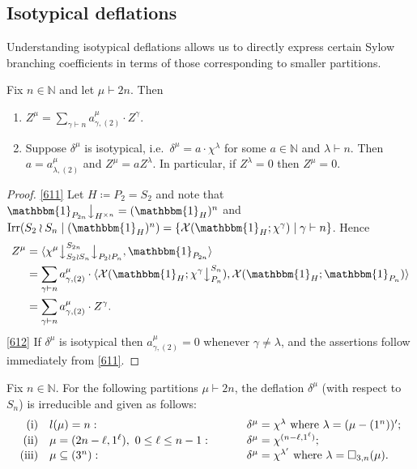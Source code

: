 \documentclass[ALCO, Unicode]{cedram}
\newcommand{\triv}{\mathbbm{1}}
\newcommand{\Irr}{\operatorname{Irr}}
\newcommand{\down}{\big\downarrow}
\newcommand{\cX}{\mathcal{X}}
\newcommand{\N}{\mathbb{N}}
\begin{document}
\subsection{Isotypical deflations}
Understanding isotypical deflations allows us to directly express certain Sylow branching coefficients in terms of those corresponding to smaller partitions.
\begin{lemma}\label{lem:isotypic}
	Fix $n\in\N$ and let $\mu\vdash 2n$. Then
	\begin{enumerate}[label=\textup{(\roman*)}]
		\item \label{611}
		$Z^\mu=\sum_{\gamma\vdash n} a^\mu_{\gamma,(2)}\cdot Z^\gamma$.
		\item \label{612} Suppose $\delta^\mu$ is isotypical, i.e.~$\delta^\mu=a\cdot\chi^\lambda$ for some $a\in\N$ and $\lambda\vdash n$. Then $a=a^\mu_{\lambda,(2)}$ and $Z^\mu=aZ^\lambda$. In particular, if $Z^\lambda=0$ then $Z^\mu=0$.
	\end{enumerate}
\end{lemma}

\begin{proof}
	\ref{611} Let $H\coloneqq P_2=S_2$ and note that $\triv_{P_{2n}}\down_{H^{\times n}} = (\triv_H)^n$ and $\Irr(S_2\wr S_n\mid (\triv_H)^n)=\{\cX(\triv_H;\chi^\gamma) \mid \gamma\vdash n \}$. Hence
	\begin{align*} Z^\mu &= \langle \chi^\mu\down^{S_{2n}}_{S_2\wr S_n}\down_{P_2\wr P_n}, \triv_{P_{2n}}\rangle\\& = \sum_{\gamma\vdash n} a^\mu_{\gamma,(2)}\cdot \langle \cX(\triv_H;\chi^\gamma\down^{S_n}_{P_n}), \cX(\triv_H;\triv_{P_n})\rangle \\&= \sum_{\gamma\vdash n} a^\mu_{\gamma,(2)}\cdot Z^\gamma. 
	\end{align*}
	\ref{612} If $\delta^\mu$ is isotypical then $a^\mu_{\gamma,(2)}=0$ whenever $\gamma\ne\lambda$, and the assertions follow immediately from \ref{611}.
\end{proof}

\begin{corollary}\label{cor:10.1,2,4}
	Fix $n\in\N$. For the following partitions $\mu\vdash 2n$, the deflation $\delta^\mu$ \textup{(}with respect to $S_n$\textup{)} is irreducible and given as follows:
	\[ \begin{array}{rlp{0.5cm}l}
		\textup{(i)} & l(\mu)=n: && \delta^\mu=\chi^\lambda\text{ where } \lambda = (\mu-(1^n))';\\
		\textup{(ii)} & \mu=(2n-\ell,1^{\ell}),\ 0\le\ell\le n-1: & \qquad & \delta^\mu = \chi^{(n-\ell,1^{\ell})};\\
		\textup{(iii)} & \mu\subseteq(3^n): && \delta^\mu=\chi^{\lambda'}\text{ where }\lambda=\square_{3,n}(\mu).
	\end{array} \]
\end{corollary}
\end{document}
